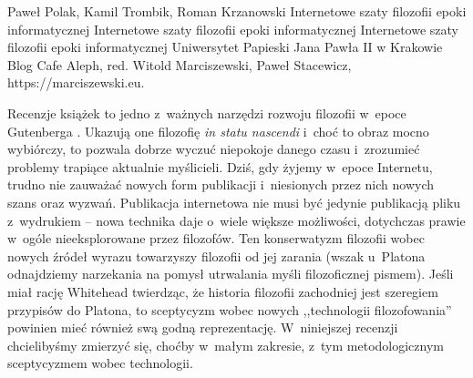 \begin{newrevplenv}{Paweł Polak, Kamil Trombik, Roman Krzanowski}
	{Internetowe szaty filozofii epoki informatycznej}
	{Internetowe szaty filozofii epoki informatycznej}
	{Internetowe szaty filozofii epoki informatycznej}
	{Uniwersytet Papieski Jana Pawła II w Krakowie}
	{Blog Cafe Aleph, red. Witold Marciszewski, Paweł Stacewicz, https://marciszewski.eu.}

\lettrine[loversize=0.13,lines=2,lraise=-0.03,nindent=0em,findent=0.2pt]%
{R}{}ecenzje książek to jedno z~ważnych narzędzi rozwoju filozofii w~epoce Gutenberga
\parencite[więcej na temat historycznej roli recenzji zob.][]{pleshkov_book_2021}. %
Ukazują one filozofię \textit{in statu nascendi} i~choć to obraz mocno wybiórczy, to pozwala dobrze wyczuć niepokoje danego czasu i~zrozumieć problemy trapiące aktualnie myślicieli. Dziś, gdy żyjemy w~epoce Internetu, trudno nie zauważać nowych form publikacji i~niesionych przez nich nowych szans oraz wyzwań. Publikacja internetowa nie musi być jedynie publikacją pliku z~wydrukiem -- nowa technika daje o~wiele większe możliwości, dotychczas prawie w~ogóle nieeksplorowane przez filozofów. Ten konserwatyzm filozofii wobec nowych źródeł wyrazu towarzyszy filozofii od jej zarania (wszak u~Platona odnajdziemy narzekania na pomysł utrwalania myśli filozoficznej pismem). Jeśli miał rację Whitehead twierdząc, że historia filozofii zachodniej jest szeregiem przypisów do Platona, to sceptycyzm wobec nowych ,,technologii filozofowania'' powinien mieć również swą godną reprezentację. W~niniejszej recenzji chcielibyśmy zmierzyć się, choćby w~małym zakresie, z~tym metodologicznym sceptycyzmem wobec technologii.


\end{newrevplenv}
